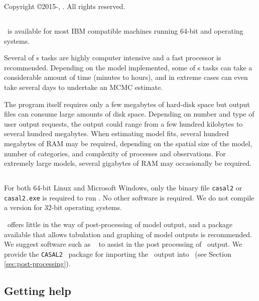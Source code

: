 Copyright \copyright 2015-\SourceControlYearDoc, \href{http://www.niwa.co.nz}{\Organisation}. All rights reserved.

\subsection{}
\CNAME\ is available for most IBM compatible machines running 64-bit  and  operating systems.

Several of \CNAME s tasks are highly computer intensive and a fast processor is recommended. Depending on the model implemented, some of \CNAME s tasks can take a considerable amount of time (minutes to hours), and in extreme cases can even take several days to undertake an MCMC estimate. 

The program itself requires only a few megabytes of hard-disk space but output files can consume large amounts of disk space. Depending on number and type of user output requests, the output could range from a few hundred kilobytes to several hundred megabytes. When estimating model fits, several hundred megabytes of RAM may be required, depending on the spatial size of the model, number of categories, and complexity of processes and observations. For extremely large models, several gigabytes of RAM may occasionally be required. 

\subsection{}

For both 64-bit Linux and Microsoft Windows, only the binary file \texttt{casal2} or \texttt{casal2.exe} is required to run \CNAME . No other software is required. We do not compile a version for 32-bit operating systems. 

\CNAME\ offers little in the way of post-processing of model output, and a package available that allows tabulation and graphing of model outputs is recommended. We suggest software such as \href{http://www.r-project.org}{\R}\ \citep{R} to assist in the post processing of \CNAME\ output. We provide the \texttt{CASAL2} \R\ package for importing the \CNAME\ output into \R\ (see Section \ref{sec:post-processing}).

\subsection{Getting help}

